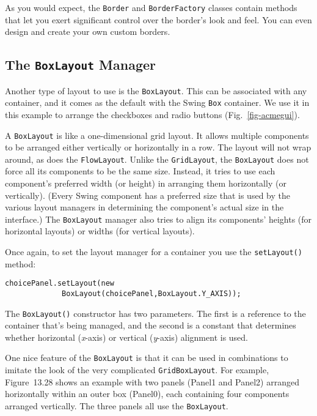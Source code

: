 As you would expect, the {\tt Border} and {\tt BorderFactory} classes
contain methods that let you exert significant control over the
border's look and feel. You can even design and create your own custom
borders.

\subsection{The {\tt BoxLayout} Manager}
\noindent Another type of layout to use is the {\tt BoxLayout}. This can be
associated with any container, and it comes as the default with the
Swing {\tt Box} container. We use it in this example to arrange the
checkboxes and radio buttons (Fig.~\ref{fig-acmegui}).

A {\tt BoxLayout} is like a one-dimensional grid layout. It allows
multiple components to be arranged either vertically or horizontally
in a row.  The layout will not wrap around, as does the
{\tt FlowLayout}. Unlike the {\tt GridLayout}, the {\tt BoxLayout} does not
force all its components to be the same size. Instead, it tries to use
each component's preferred width (or height) in arranging them
horizontally (or vertically).
(Every Swing component has a preferred
size that is used by the various layout managers in determining the
component's actual size in the interface.)  The {\tt BoxLayout}
manager also tries to align its components' heights (for horizontal
layouts) or widths (for vertical layouts).


Once again, to set the layout manager for a container you use the
{\tt setLayout()} method:

\begin{jjjlisting}
\begin{lstlisting}
choicePanel.setLayout(new 
             BoxLayout(choicePanel,BoxLayout.Y_AXIS));
\end{lstlisting}
\end{jjjlisting}

\noindent The {\tt BoxLayout()} constructor has two parameters. The
first is a reference to the container that's being managed, and the
second is a constant that determines whether horizontal ({\it x}-axis) or
vertical ({\it y}-axis) alignment is used.

One nice feature of the {\tt BoxLayout} is that it can be used in
combinations to imitate the look of the very complicated
{\tt GridBoxLayout}. For example, Figure~13.28 shows an
example with two panels (Panel1 and Panel2) arranged horizontally
within an outer box (Panel0), each containing four components arranged
vertically. The three panels all use the {\tt BoxLayout}.


